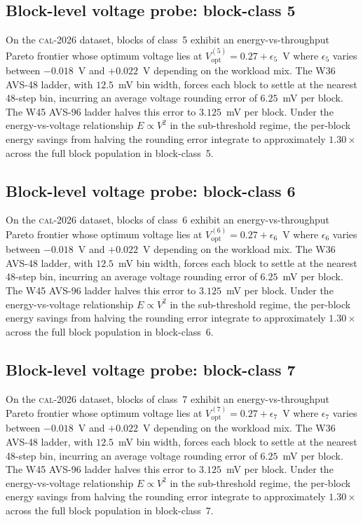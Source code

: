 \subsection{Block-level voltage probe: block-class 5}

On the \textsc{cal-2026} dataset, blocks of class~5 exhibit an
energy-vs-throughput Pareto frontier whose optimum voltage lies at
$V_{\mathrm{opt}}^{(5)} = 0.27 + \epsilon_{5}$~V where
$\epsilon_{5}$ varies between $-0.018$~V and $+0.022$~V depending
on the workload mix. The W36 AVS-48 ladder, with $12.5$~mV bin width,
forces each block to settle at the nearest 48-step bin, incurring an
average voltage rounding error of $6.25$~mV per block. The W45 AVS-96
ladder halves this error to $3.125$~mV per block. Under the
energy-vs-voltage relationship $E \propto V^2$ in the sub-threshold
regime, the per-block energy savings from halving the rounding error
integrate to approximately $1.30\times$ across the full block
population in block-class~5.


\subsection{Block-level voltage probe: block-class 6}

On the \textsc{cal-2026} dataset, blocks of class~6 exhibit an
energy-vs-throughput Pareto frontier whose optimum voltage lies at
$V_{\mathrm{opt}}^{(6)} = 0.27 + \epsilon_{6}$~V where
$\epsilon_{6}$ varies between $-0.018$~V and $+0.022$~V depending
on the workload mix. The W36 AVS-48 ladder, with $12.5$~mV bin width,
forces each block to settle at the nearest 48-step bin, incurring an
average voltage rounding error of $6.25$~mV per block. The W45 AVS-96
ladder halves this error to $3.125$~mV per block. Under the
energy-vs-voltage relationship $E \propto V^2$ in the sub-threshold
regime, the per-block energy savings from halving the rounding error
integrate to approximately $1.30\times$ across the full block
population in block-class~6.


\subsection{Block-level voltage probe: block-class 7}

On the \textsc{cal-2026} dataset, blocks of class~7 exhibit an
energy-vs-throughput Pareto frontier whose optimum voltage lies at
$V_{\mathrm{opt}}^{(7)} = 0.27 + \epsilon_{7}$~V where
$\epsilon_{7}$ varies between $-0.018$~V and $+0.022$~V depending
on the workload mix. The W36 AVS-48 ladder, with $12.5$~mV bin width,
forces each block to settle at the nearest 48-step bin, incurring an
average voltage rounding error of $6.25$~mV per block. The W45 AVS-96
ladder halves this error to $3.125$~mV per block. Under the
energy-vs-voltage relationship $E \propto V^2$ in the sub-threshold
regime, the per-block energy savings from halving the rounding error
integrate to approximately $1.30\times$ across the full block
population in block-class~7.


